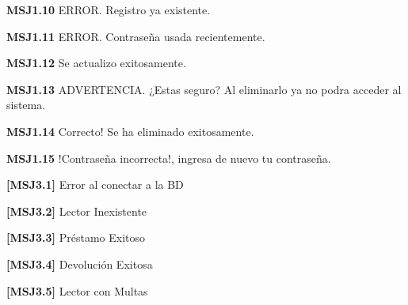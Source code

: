 	\begin{Citemize}
	\item {\bf MSJ1.10} ERROR. Registro ya existente.
	\end{Citemize}
	
	\begin{Citemize}
	\item {\bf MSJ1.11} ERROR. Contraseña usada recientemente.
	\end{Citemize}
	
	\begin{Citemize}
	\item {\bf MSJ1.12} Se actualizo exitosamente.
	\end{Citemize}
	
	\begin{Citemize}
	\item {\bf MSJ1.13} ADVERTENCIA. ¿Estas seguro? Al eliminarlo ya no podra acceder al sistema.
	\end{Citemize}
	
	\begin{Citemize}
	\item {\bf MSJ1.14} Correcto! Se ha eliminado exitosamente.
	\end{Citemize}
	
	\begin{Citemize}
	\item {\bf MSJ1.15} !Contraseña incorrecta!, ingresa de nuevo tu contraseña.
	\end{Citemize}

	\begin{Citemize}
	\item {\bf [MSJ3.1]} Error al conectar a la BD
	\end{Citemize}

	\begin{Citemize}
	\item {\bf [MSJ3.2]} Lector Inexistente
	\end{Citemize}
	
	\begin{Citemize}
	\item {\bf [MSJ3.3]} Préstamo Exitoso
	\end{Citemize}
	
	\begin{Citemize}
	\item {\bf [MSJ3.4]} Devolución Exitosa
	\end{Citemize}
	
	\begin{Citemize}
	\item {\bf [MSJ3.5]} Lector con Multas
	\end{Citemize}
	
